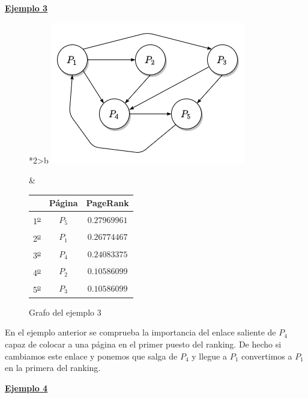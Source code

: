 \documentclass[size=a4, parskip=half, titlepage=false, toc=flat, toc=bib, 12pt, twoside]{scrartcl}
\theoremstyle{theorem-style}
\theoremstyle{definition-style}
\theoremstyle{remark-style}
\theoremstyle{example-style}
\theoremstyle{definition-style}
\theoremstyle{remark-style}
\begin{document}
\underline{\textbf{Ejemplo 3}}

\begin{figure}[!ht]
  \begin{tabular}{*{2}{>{\centering\arraybackslash}b{}}}
  \centering
    \includegraphics[scale=0.5]{./img/grafoej3}
    \caption{Grafo del ejemplo 3}
    \label{ejemplo3}
    &
      \renewcommand{\arraystretch}{1.3}
      \begin{tabular}{ccc}
        & Página & PageRank     \\ \hline
      1\textsuperscript{\underline{o}}} & $P_5$  & $0.27969961$ \\ \hline
      2\textsuperscript{\underline{o}}} & $P_1$  & $0.26774467$ \\ \hline
      3\textsuperscript{\underline{o}}} & $P_4$  & $0.24083375$ \\ \hline
      4\textsuperscript{\underline{o}}} & $P_2$  & $0.10586099$ \\ \hline
      5\textsuperscript{\underline{o}}} & $P_3$  & $0.10586099$ \\ \hline
      \end{tabular}
    \end{tabular}
\end{figure}

En el ejemplo anterior se comprueba la importancia del enlace saliente de $P_4$ capaz de colocar a una página en el primer puesto del ranking. De hecho si cambiamos este enlace y ponemos que salga de $P_4$ y llegue a $P_1$ convertimos a $P_1$ en la primera del ranking.

\underline{\textbf{Ejemplo 4}}
\end{document}
